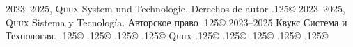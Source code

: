 \documentclass{cookbook}
\begin{document}
{{{	2023--2025, \textsc{Quux} System und Technologie.
Derechos de autor {\lower.125\baselineskip\hbox{\copyright}} %
	2023--2025, \textsc{Quux} Sistema y Tecnología.
\foreignlanguage{russian}{Авторское право} %
	{\lower.125\baselineskip\hbox{\copyright}}
	2023–2025 \foreignlanguage{russian}{Квукс Система и Технология.}
{\lower.125\baselineskip\hbox{\copyright}}
{\lower.125\baselineskip\hbox{\copyright}}
{\lower.125\baselineskip\hbox{\copyright}}
{\lower.125\baselineskip\hbox{\copyright}}
\textsc{Quux}
{\lower.125\baselineskip\hbox{\copyright}}
{\lower.125\baselineskip\hbox{\copyright}}
{\lower.125\baselineskip\hbox{\copyright}}
{\lower.125\baselineskip\hbox{\copyright}}
{\lower.125\baselineskip\hbox{\copyright}}
\vspace{-.5\textheight}%
}}}%
\end{document}
